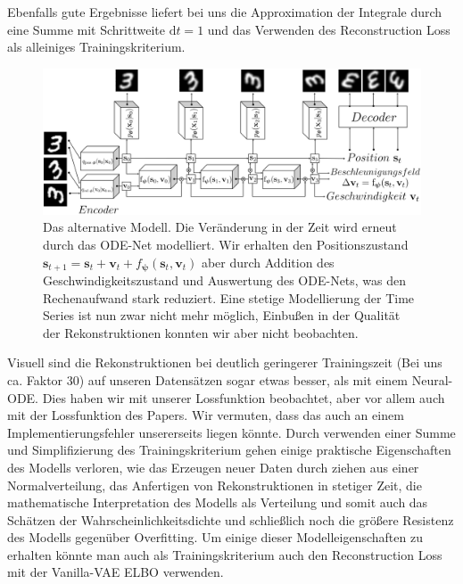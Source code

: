 \documentclass[12pt]{article}
\begin{document}
	Ebenfalls gute Ergebnisse liefert bei uns die Approximation der Integrale durch eine Summe mit Schrittweite $\mathrm{d}t=1$ und das Verwenden des Reconstruction Loss als alleiniges Trainingskriterium.\\
	\begin{figure}[h!]
		\centering
		\includegraphics[scale=0.41]{ODE2VAE_Modell}
		\captionsetup{labelformat=empty}
		\caption{Das alternative Modell. Die Veränderung in der Zeit wird erneut durch das ODE-Net modelliert. Wir erhalten den Positionszustand $\mathbf{s}_{t+1} = \mathbf{s}_{t} + \mathbf{v}_{t} + f_{\boldsymbol\psi}(\mathbf{s}_{t}, \mathbf{v}_{t})$ aber durch Addition des Geschwindigkeitszustand und Auswertung des ODE-Nets, was den Rechenaufwand stark reduziert. Eine stetige Modellierung der Time Series ist nun zwar nicht mehr möglich, Einbußen in der Qualität der Rekonstruktionen konnten wir aber nicht beobachten.}
	\end{figure}

	Visuell sind die Rekonstruktionen bei deutlich geringerer Trainingszeit (Bei uns ca. Faktor 30) auf unseren Datensätzen sogar etwas besser, als mit einem Neural-ODE. Dies haben wir mit unserer Lossfunktion beobachtet, aber vor allem auch mit der Lossfunktion des Papers. Wir vermuten, dass das auch an einem Implementierungsfehler unsererseits liegen könnte.
	Durch verwenden einer Summe und Simplifizierung des Trainingskriterium gehen einige praktische Eigenschaften des Modells verloren, wie das Erzeugen neuer Daten durch ziehen aus einer Normalverteilung, das Anfertigen von Rekonstruktionen in stetiger Zeit, die mathematische Interpretation des Modells als Verteilung und somit auch das Schätzen der Wahrscheinlichkeitsdichte und schließlich noch die größere Resistenz des Modells gegenüber Overfitting.
	Um einige dieser Modelleigenschaften zu erhalten könnte man auch als Trainingskriterium auch den Reconstruction Loss mit der Vanilla-VAE ELBO verwenden.


	\newpage
\end{document}
